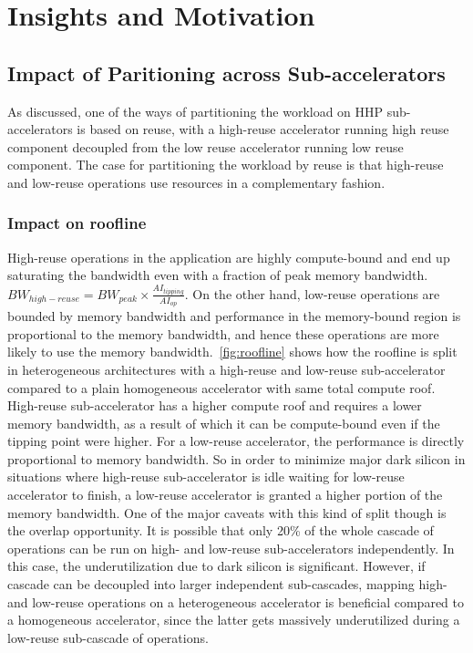 \section{Insights and Motivation}
\label{sec:motivation}

\subsection{Impact of Paritioning across Sub-accelerators}


As discussed, one of the ways of partitioning the workload on HHP sub-accelerators is based on reuse, with a high-reuse accelerator running high reuse component decoupled from the low reuse accelerator running low reuse component. The case for partitioning the workload by reuse is that high-reuse and low-reuse operations use resources in a complementary fashion.

\subsubsection{Impact on roofline}

 High-reuse operations in the application are highly compute-bound and end up saturating the bandwidth even with a fraction of peak memory bandwidth. $BW_{high-reuse}=BW_{peak}\times \frac{AI_{tipping}}{AI_{op}}$. On the other hand, low-reuse operations are bounded by memory bandwidth and performance in the memory-bound region is proportional to the memory bandwidth, and hence these operations are more likely to use the memory bandwidth.~\autoref{fig:roofline} shows how the roofline is split in heterogeneous architectures with a high-reuse and low-reuse sub-accelerator compared to a plain homogeneous accelerator with same total compute roof. High-reuse sub-accelerator has a higher compute roof and requires a lower memory bandwidth, as a result of which it can be compute-bound even if the tipping point were higher. For a low-reuse accelerator, the performance is directly proportional to memory bandwidth. So in order to minimize major dark silicon in situations where high-reuse sub-accelerator is idle waiting for low-reuse accelerator to finish, a low-reuse accelerator is granted a higher portion of the memory bandwidth. One of the major caveats with this kind of split though is the overlap opportunity. It is possible that only 20\% of the whole cascade of operations can be run on high- and low-reuse sub-accelerators independently. In this case, the underutilization due to dark silicon is significant. However, if cascade can be decoupled into larger independent sub-cascades, mapping high- and low-reuse operations on a heterogeneous accelerator is beneficial compared to a homogeneous accelerator, since the latter gets massively underutilized during a low-reuse sub-cascade of operations.

